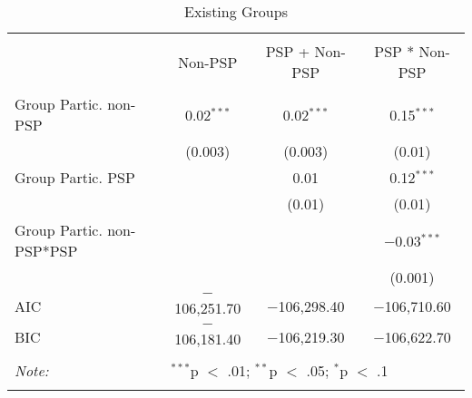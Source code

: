 
\begin{table}[!htbp] \centering 
  \caption{Existing Groups} 
  \label{table:splitpart} 
\begin{tabular}{@{\extracolsep{5pt}}lccc} 
\\[-1.8ex]\hline \\[-1.8ex] 
 & Non-PSP & PSP + Non-PSP & PSP * Non-PSP \\ 
\hline \\[-1.8ex] 
 Group Partic. non-PSP & 0.02$^{***}$ & 0.02$^{***}$ & 0.15$^{***}$ \\ 
  & (0.003) & (0.003) & (0.01) \\ 
  Group Partic. PSP &  & 0.01 & 0.12$^{***}$ \\ 
  &  & (0.01) & (0.01) \\ 
  Group Partic. non-PSP*PSP &  &  & $-$0.03$^{***}$ \\ 
  &  &  & (0.001) \\ 
 AIC & $-$106,251.70 & $-$106,298.40 & $-$106,710.60 \\ 
BIC & $-$106,181.40 & $-$106,219.30 & $-$106,622.70 \\ 
\hline \\[-1.8ex] 
\textit{Note:} & \multicolumn{3}{l}{$^{***}$p $<$ .01; $^{**}$p $<$ .05; $^{*}$p $<$ .1} \\ 
\normalsize 
\end{tabular} 
\end{table} 
